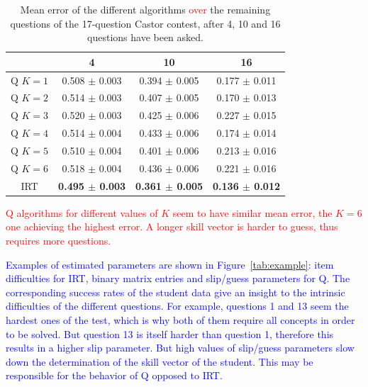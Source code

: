 \documentclass{sig-alternate}
\newcommand\alert[1]{\textcolor{red}{#1}}
\newcommand\note[1]{\textcolor{blue}{#1}}
\begin{document}
\begin{table}[H]
\small\centering\begin{tabular}{@{}cccc@{}}
& 4 & 10 & 16\\
\hline
Q $K = 1$ & 0.508 $\pm$ 0.003 & 0.394 $\pm$ 0.005 & 0.177 $\pm$ 0.011 \\
Q $K = 2$ & 0.514 $\pm$ 0.003 & 0.407 $\pm$ 0.005 & 0.170 $\pm$ 0.013 \\
Q $K = 3$ & 0.520 $\pm$ 0.003 & 0.425 $\pm$ 0.006 & 0.227 $\pm$ 0.015 \\
Q $K = 4$ & 0.514 $\pm$ 0.004 & 0.433 $\pm$ 0.006 & 0.174 $\pm$ 0.014 \\
Q $K = 5$ & 0.510 $\pm$ 0.004 & 0.401 $\pm$ 0.006 & 0.213 $\pm$ 0.016 \\
Q $K = 6$ & 0.518 $\pm$ 0.004 & 0.436 $\pm$ 0.006 & 0.221 $\pm$ 0.016 \\
IRT & \textbf{0.495 $\pm$ 0.003} & \textbf{0.361 $\pm$ 0.005} & \textbf{0.136 $\pm$ 0.012} \\
\end{tabular}
\caption{Mean error of the different algorithms \alert{over} the remaining questions of the 17-question Castor contest, after 4, 10 and 16 questions have been asked.}
\label{tab:error}
\end{table}

\alert{Q algorithms for different values of $K$ seem to have similar mean error, the $K = 6$ one achieving the highest error. A longer skill vector is harder to guess, thus requires more questions.} %

\note{Examples of estimated parameters are shown in Figure~\ref{tab:example}: item difficulties for IRT, binary matrix entries and slip/guess parameters for Q. The corresponding success rates of the student data give an insight to the intrinsic difficulties of the different questions. For example, questions 1 and 13 seem the hardest ones of the test, which is why both of them require all concepts in order to be solved. But question 13 is itself harder than question 1, therefore this results in a higher slip parameter. But high values of slip/guess parameters slow down the determination of the skill vector of the student. This may be responsible for the behavior of Q opposed to IRT.}
\end{document}
